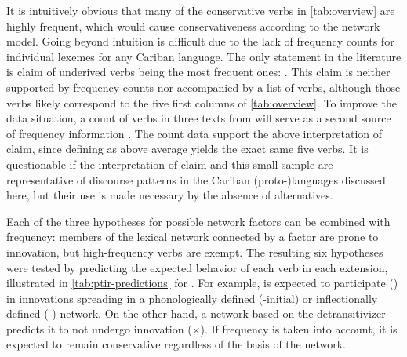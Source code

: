 It is intuitively obvious that many of the conservative verbs in \cref{tab:overview} are highly frequent, which would cause conservativeness according to the network model.
Going beyond intuition is difficult due to the lack of frequency counts for individual lexemes for any Cariban language.
The only statement in the literature is  claim of \kalina underived  verbs being the most frequent ones: .
This claim is neither supported by frequency counts nor accompanied by a list of verbs, although those verbs likely correspond to the five first columns of \cref{tab:overview}.
To improve the data situation, a count of  verbs in three \apalai texts from \textcite{koehns1994textos} will serve as a second source of frequency information .
The count data support the above interpretation of  claim, since defining  as above average yields the exact same five verbs.
It is questionable if the interpretation of  claim and this small \apalai sample are representative of discourse patterns in the Cariban (proto-)languages discussed here, but their use is made necessary by the absence of alternatives.




Each of the three hypotheses for possible network factors can be combined with frequency: members of the lexical network connected by a factor are prone to innovation, but high-frequency verbs are exempt.
The resulting six hypotheses were tested by predicting the expected behavior of each verb in each extension, illustrated in \cref{tab:ptir-predictions} for \PTir.
For example,   is expected to participate (\checkmark) in innovations spreading in a phonologically defined (-initial) or inflectionally defined ( ) network.
On the other hand, a network based on the detransitivizer predicts it to not undergo innovation (×).
If frequency is taken into account, it is expected to remain conservative regardless of the basis of the network.



